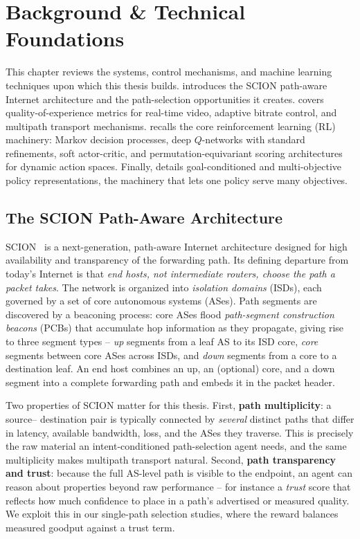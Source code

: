 \chapter{Background \& Technical Foundations}
\label{ch:background}

This chapter reviews the systems, control mechanisms, and machine learning techniques 
upon which this thesis builds.  introduces the SCION 
path-aware Internet architecture and the path-selection opportunities it creates. 
 covers quality-of-experience metrics for real-time video, adaptive 
bitrate control, and multipath transport mechanisms.  recalls 
the core reinforcement learning (RL) machinery: Markov decision processes, deep $Q$-networks 
with standard refinements, soft actor-critic, and permutation-equivariant scoring architectures 
for dynamic action spaces. Finally,  details goal-conditioned and
multi-objective policy representations, the machinery that lets one policy serve many objectives.

\section{The SCION Path-Aware Architecture}
\label{sec:background:scion}

SCION~\cite{Perrig2017} is a next-generation, path-aware Internet architecture designed for high
availability and transparency of the forwarding path. Its defining departure from today's Internet
is that \emph{end hosts, not intermediate routers, choose the path a packet takes}. The network is
organized into \emph{isolation domains} (ISDs), each governed by a set of core autonomous systems
(ASes). Path segments are discovered by a beaconing process: core ASes flood \emph{path-segment
construction beacons} (PCBs) that accumulate hop information as they propagate, giving rise to three
segment types -- \emph{up} segments from a leaf AS to its ISD core, \emph{core} segments between
core ASes across ISDs, and \emph{down} segments from a core to a destination leaf. An end host
combines an up, an (optional) core, and a down segment into a complete forwarding path and embeds it
in the packet header.

Two properties of SCION matter for this thesis. First, \textbf{path multiplicity}: a source--
destination pair is typically connected by \emph{several} distinct paths that differ in latency,
available bandwidth, loss, and the ASes they traverse. This is precisely the raw material an
intent-conditioned path-selection agent needs, and the same multiplicity makes multipath transport natural. 
Second, \textbf{path transparency and trust}: because the full AS-level path is visible to the endpoint, 
an agent can reason about properties beyond raw performance -- for instance a \emph{trust} score that
reflects how much confidence to place in a path's advertised or measured quality. We exploit this
in our single-path selection studies, where the reward balances measured goodput against a trust term.

